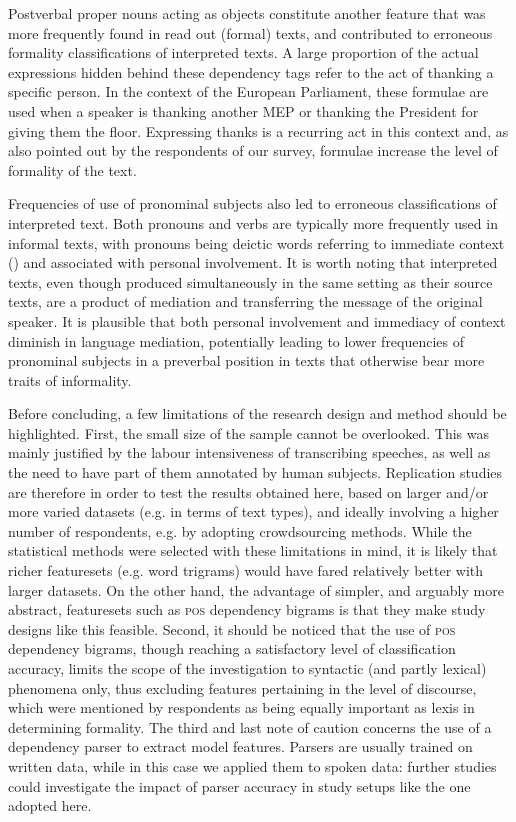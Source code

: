 \documentclass[output=paper]{langscibook}
\begin{document}
Postverbal proper nouns acting as objects constitute another feature that was more frequently found in read out (formal) texts, and contributed to erroneous formality classifications of interpreted texts. A large proportion of the actual expressions hidden behind these dependency tags refer to the act of thanking a specific person. In the context of the European Parliament, these formulae are used when a speaker is thanking another MEP or thanking the President for giving them the floor. Expressing thanks is a recurring act in this context and, as also pointed out by the respondents of our survey, formulae increase the level of formality of the text.

Frequencies of use of pronominal subjects also led to erroneous classifications of interpreted text. Both pronouns and verbs are typically more frequently used in informal texts, with pronouns being deictic words referring to immediate context (\citealt{HeylighenDewaele1999}) and associated with personal involvement. It is worth noting that interpreted texts, even though produced simultaneously in the same setting as their source texts, are a product of mediation and transferring the message of the original speaker. It is plausible that both personal involvement and immediacy of context diminish in language mediation, potentially leading to lower frequencies of pronominal subjects in a preverbal position in texts that otherwise bear more traits of informality. 

Before concluding, a few limitations of the research design and method should be highlighted. First, the small size of the sample cannot be overlooked. This was mainly justified by the labour intensiveness of transcribing speeches, as well as the need to have part of them annotated by human subjects. Replication studies are therefore in order to test the results obtained here, based on larger and/or more varied datasets (e.g. in terms of text types), and ideally involving a higher number of respondents, e.g. by adopting crowdsourcing methods. While the statistical methods were selected with these limitations in mind, it is likely that richer featuresets (e.g. word trigrams) would have fared relatively better with larger datasets. On the other hand, the advantage of simpler, and arguably more abstract, featuresets such as \textsc{pos} dependency bigrams is that they make study designs like this feasible. Second, it should be noticed that the use of \textsc{pos} dependency bigrams, though reaching a satisfactory level of classification accuracy, limits the scope of the investigation to syntactic (and partly lexical) phenomena only, thus excluding features pertaining in the level of discourse, which were mentioned by respondents as being equally important as lexis in determining formality. The third and last note of caution concerns the use of a dependency parser to extract model features. Parsers are usually trained on written data, while in this case we applied them to spoken data: further studies could investigate the impact of parser accuracy in study setups like the one adopted here. 
\end{document}
